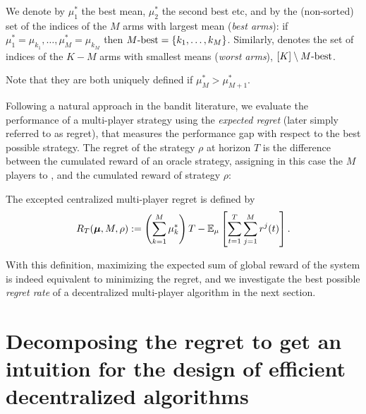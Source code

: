 \begin{definition}\label{def:5:MbestMworst}
  We denote by $\mu_1^*$ the best mean, $\mu_2^*$ the second best etc, and
  by \Mbest{} the (non-sorted) set of the indices of the $M$ arms with largest mean (\emph{best arms}): if $\mu_1^* = \mu_{k_1}, \dots, \mu_M^* = \mu_{k_M}$
  then $M\text{-}\mathrm{best} = \{k_1, \dots, k_M\}$.
  Similarly, \Mworst{} denotes the set of indices of the $K-M$ arms with smallest means (\emph{worst arms}),
  $[K] \setminus M\text{-}\mathrm{best}$.

  Note that they are both uniquely defined if $\mu_M^* > \mu_{M+1}^*$.
\end{definition}

Following a natural approach in the bandit literature, we evaluate the performance of a multi-player strategy using the \emph{expected regret} (later simply referred to as regret), that measures the performance gap with respect to the best possible strategy.
The regret of the strategy $\rho$ at horizon $T$ is the difference between the cumulated reward of an oracle strategy, assigning in this case the $M$ players to \Mbest,
and the cumulated reward of strategy $\rho$:

\begin{definition}
  The excepted centralized multi-player regret is defined by
  \begin{equation}\label{eq:5:regret}
    R_T(\boldsymbol{\mu}, M, \rho) := \left(\sum_{k=1}^{M}\mu_k^*\right)T - \mathbb{E}_{\mu}\left[\sum_{t=1}^T\sum_{j=1}^M r^j(t)\right].
  \end{equation}
\end{definition}

With this definition, maximizing the expected sum of global reward of the system is indeed equivalent to minimizing the regret, and we investigate the best possible \emph{regret rate} of a decentralized multi-player algorithm in the next section.



\section[Decomposing the regret to get an intuition about efficient decentralized algorithms]{Decomposing the regret to get an intuition for the design of efficient decentralized algorithms}
\label{sec:5:lowerbound}

